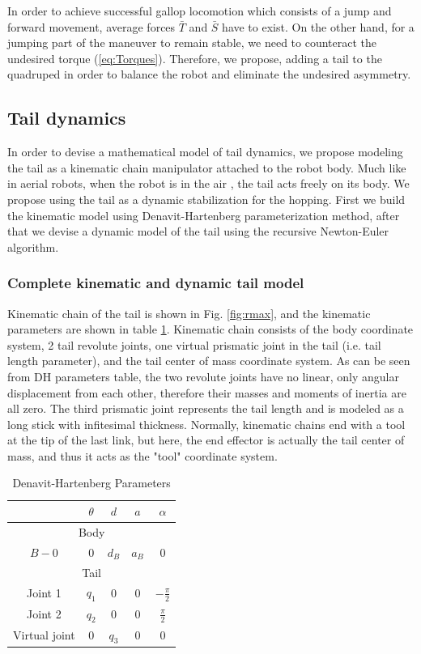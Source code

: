 In order to achieve successful gallop locomotion which consists of a jump and forward movement, average forces $\bar{T}$ and $\bar{S}$ have to exist. On the other hand, for a jumping part of the maneuver to remain stable, we need to counteract the undesired torque (\ref{eq:Torques}). Therefore, we propose, adding a tail to the quadruped in order to balance the robot and eliminate the undesired asymmetry. 

\subsection{Tail dynamics}
In order to devise a mathematical model of tail dynamics, we propose modeling the tail as a kinematic chain manipulator attached to the robot body. Much like in aerial robots, when the robot is in the air \cite{Korpela2013ICRA,Orsag2012JINT}, the tail acts freely on its body. We propose using the tail as a dynamic stabilization for the hopping. First we build the kinematic model using Denavit-Hartenberg parameterization method, after that we devise a dynamic model of the tail using the recursive Newton-Euler algorithm.
\subsubsection{Complete kinematic and dynamic tail model}
Kinematic chain of the tail is shown in Fig. \ref{fig:rmax}, and the kinematic parameters are shown in table \ref{tab:DHParameters}. Kinematic chain consists of the body coordinate system, 2 tail revolute joints, one virtual prismatic joint in the tail (i.e. tail length parameter), and the tail center of mass coordinate system. As can be seen from DH parameters table, the two revolute joints have no linear, only angular displacement from each other, therefore their masses and moments of inertia are all zero. The third prismatic joint represents the tail length and is modeled as a long stick with infitesimal thickness. Normally, kinematic chains end with a tool at the tip of the last link, but here, the end effector is actually the tail center of mass, and thus it acts as the "tool" coordinate system.

\begin{table}
	\centering
		\begin{tabular}{ccccc}
		\hline
			& $\theta$ & $d$ & $a$ & $\alpha$ \\\hline
			\multicolumn{5}{c}{Body}\\\hline
			$B-0$ & $0$ & $d_B$ & $a_B$ & $0$\\\hline
			\multicolumn{5}{c}{Tail}\\\hline
			Joint 1 & $q_1$ & $0$ & $0$ & $-\frac{\pi}{2}$\\
			Joint 2 & $q_2$ & $0$ & $0$ & $\frac{\pi}{2}$\\
			Virtual joint& $0$ & $q_3$ & $0$ & $0$\\\hline
		\end{tabular}
	\caption{Denavit-Hartenberg Parameters}\label{tab:DHParameters}
\end{table}

